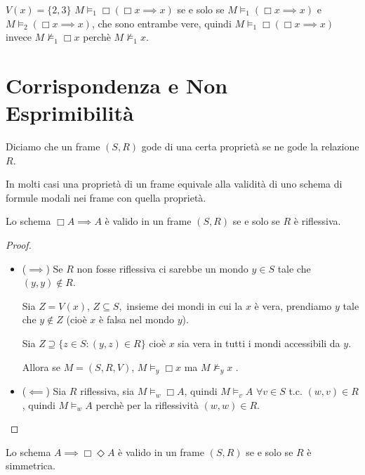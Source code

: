 \documentclass[../main.tex]{subfiles}
\begin{document}
\begin{enumerate}
          $V(x) = \{2,3\}$ $M \vDash_1 \Box (\Box x \implies x)$ se e solo se $M \vDash_1 (\Box x \implies x)$ e $M \vDash_2 (\Box x \implies x)$, che sono entrambe vere, quindi $M \vDash_1 \Box (\Box x \implies x)$ invece $M \nvDash_1 \Box x$ perchè $M \nvDash_1 x$.
\end{enumerate}

\section{Corrispondenza e Non Esprimibilità}
\begin{definition}
    Diciamo che un frame $(S,R)$ gode di una certa proprietà se ne gode la relazione $R$.
\end{definition}
In molti casi una proprietà di un frame equivale alla validità di uno schema di formule modali nei frame con quella proprietà.
\begin{theorem}
    Lo schema $\Box A \implies A$ è valido in un frame $(S,R)$ se e solo se $R$ è riflessiva.
\end{theorem}
\begin{proof}\
    \begin{itemize}
        \item ($\implies$) Se $R$ non fosse riflessiva ci sarebbe un mondo $y \in S$ tale che $(y,y) \notin R$.

              Sia $Z = V(x)$, $Z \subseteq S,$ insieme dei mondi in cui la $x$ è vera, prendiamo $y$ tale che $y \notin Z$ (cioè $x$ è falsa nel mondo $y$).

              Sia $Z \supseteq \{z \in S : (y,z) \in R\}$ cioè $x$ sia vera in tutti i mondi accessibili da $y$.

              Allora se $M = (S, R, V)$, $M \vDash_y \Box x$ ma $M \nvDash_y x$ \Lightning.

        \item ($\impliedby$) Sia $R$ riflessiva, sia $M \vDash_w \Box A$, quindi $M \vDash_v A$ $\forall v \in S$ t.c. $(w,v) \in R$, quindi $M \vDash_w A$ perchè per la riflessività $(w,w) \in R$.
    \end{itemize}
\end{proof}
\begin{theorem}
    Lo schema $ A \implies \Box \Diamond A$ è valido in un frame $(S,R)$ se e solo se $R$ è simmetrica.
\end{theorem}
\end{document}
